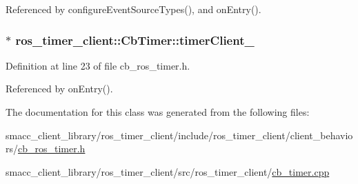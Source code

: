 Referenced by configure\+Event\+Source\+Types(), and on\+Entry().

\subsubsection[{\texorpdfstring{timer\+Client\+\_\+}{timerClient_}}]{$\ast$ ros\+\_\+timer\+\_\+client\+::\+Cb\+Timer\+::timer\+Client\+\_\+\hspace{0.3cm}{\ttfamily [private]}}\hypertarget{classros__timer__client_1_1CbTimer_a370d115a7423db45ca375673db8a4ed1}{}\label{classros__timer__client_1_1CbTimer_a370d115a7423db45ca375673db8a4ed1}


Definition at line 23 of file cb\+\_\+ros\+\_\+timer.\+h.



Referenced by on\+Entry().



The documentation for this class was generated from the following files\+:\begin{DoxyCompactItemize}
\item 
smacc\+\_\+client\+\_\+library/ros\+\_\+timer\+\_\+client/include/ros\+\_\+timer\+\_\+client/client\+\_\+behaviors/\hyperlink{cb__ros__timer_8h}{cb\+\_\+ros\+\_\+timer.\+h}\item 
smacc\+\_\+client\+\_\+library/ros\+\_\+timer\+\_\+client/src/ros\+\_\+timer\+\_\+client/\hyperlink{cb__timer_8cpp}{cb\+\_\+timer.\+cpp}\end{DoxyCompactItemize}
